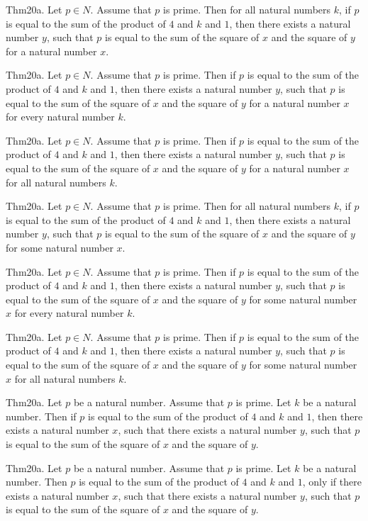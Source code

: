 \documentclass{article}
\begin{document}
Thm20a. Let $p \in N$. Assume that $p$ is prime. Then for all natural numbers $k$, if $p$ is equal to the sum of the product of $4$ and $k$ and $1$, then there exists a natural number $y$, such that $p$ is equal to the sum of the square of $x$ and the square of $y$ for a natural number $x$.

Thm20a. Let $p \in N$. Assume that $p$ is prime. Then if $p$ is equal to the sum of the product of $4$ and $k$ and $1$, then there exists a natural number $y$, such that $p$ is equal to the sum of the square of $x$ and the square of $y$ for a natural number $x$ for every natural number $k$.

Thm20a. Let $p \in N$. Assume that $p$ is prime. Then if $p$ is equal to the sum of the product of $4$ and $k$ and $1$, then there exists a natural number $y$, such that $p$ is equal to the sum of the square of $x$ and the square of $y$ for a natural number $x$ for all natural numbers $k$.

Thm20a. Let $p \in N$. Assume that $p$ is prime. Then for all natural numbers $k$, if $p$ is equal to the sum of the product of $4$ and $k$ and $1$, then there exists a natural number $y$, such that $p$ is equal to the sum of the square of $x$ and the square of $y$ for some natural number $x$.

Thm20a. Let $p \in N$. Assume that $p$ is prime. Then if $p$ is equal to the sum of the product of $4$ and $k$ and $1$, then there exists a natural number $y$, such that $p$ is equal to the sum of the square of $x$ and the square of $y$ for some natural number $x$ for every natural number $k$.

Thm20a. Let $p \in N$. Assume that $p$ is prime. Then if $p$ is equal to the sum of the product of $4$ and $k$ and $1$, then there exists a natural number $y$, such that $p$ is equal to the sum of the square of $x$ and the square of $y$ for some natural number $x$ for all natural numbers $k$.

Thm20a. Let $p$ be a natural number. Assume that $p$ is prime. Let $k$ be a natural number. Then if $p$ is equal to the sum of the product of $4$ and $k$ and $1$, then there exists a natural number $x$, such that there exists a natural number $y$, such that $p$ is equal to the sum of the square of $x$ and the square of $y$.

Thm20a. Let $p$ be a natural number. Assume that $p$ is prime. Let $k$ be a natural number. Then $p$ is equal to the sum of the product of $4$ and $k$ and $1$, only if there exists a natural number $x$, such that there exists a natural number $y$, such that $p$ is equal to the sum of the square of $x$ and the square of $y$.
\end{document}

